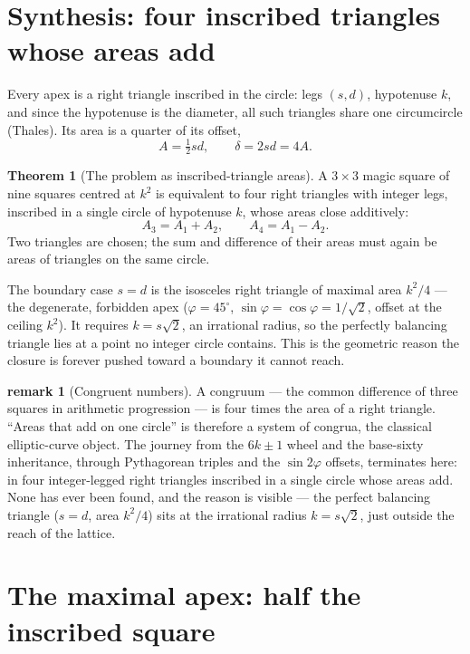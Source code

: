 \documentclass[11pt]{article}
\theoremstyle{definition}
\newtheorem{theorem}{Theorem}
\newtheorem{remark}{remark}
\begin{document}
\section{Synthesis: four inscribed triangles whose areas add}

Every apex is a right triangle inscribed in the circle: legs $(s,d)$, hypotenuse
$k$, and since the hypotenuse is the diameter, all such triangles share one
circumcircle (Thales). Its area is a quarter of its offset,
\[
  A=\tfrac12 sd,\qquad \delta=2sd=4A.
\]

\begin{theorem}[The problem as inscribed-triangle areas]\label{thm:synthesis}
A $3\times3$ magic square of nine squares centred at $k^{2}$ is equivalent to
four right triangles with integer legs, inscribed in a single circle of
hypotenuse $k$, whose areas close additively:
\[
  A_3=A_1+A_2,\qquad A_4=A_1-A_2.
\]
Two triangles are chosen; the sum and difference of their areas must again be
areas of triangles on the same circle.
\end{theorem}

\noindent The boundary case $s=d$ is the isosceles right triangle of maximal
area $k^{2}/4$ --- the degenerate, forbidden apex ($\varphi=45^\circ$,
$\sin\varphi=\cos\varphi=1/\sqrt2$, offset at the ceiling $k^{2}$). It requires
$k=s\sqrt2$, an irrational radius, so the perfectly balancing triangle lies at a
point no integer circle contains. This is the geometric reason the closure is
forever pushed toward a boundary it cannot reach.

\begin{remark}[Congruent numbers]
A congruum --- the common difference of three squares in arithmetic progression
--- is four times the area of a right triangle. ``Areas that add on one circle''
is therefore a system of congrua, the classical elliptic-curve object. The
journey from the $6k\pm1$ wheel and the base-sixty inheritance, through
Pythagorean triples and the $\sin2\varphi$ offsets, terminates here: in four
integer-legged right triangles inscribed in a single circle whose areas add.
None has ever been found, and the reason is visible --- the perfect balancing
triangle ($s=d$, area $k^{2}/4$) sits at the irrational radius $k=s\sqrt2$, just
outside the reach of the lattice.
\end{remark}

\section{The maximal apex: half the inscribed square}
\end{document}
